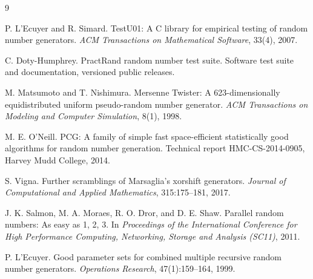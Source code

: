 \documentclass[11pt,a4paper]{article}
\begin{document}
\begin{thebibliography}{9}

P. L'Ecuyer and R. Simard.
\newblock TestU01: A C library for empirical testing of random number generators.
\newblock \emph{ACM Transactions on Mathematical Software}, 33(4), 2007.

C. Doty-Humphrey.
\newblock PractRand random number test suite.
\newblock Software test suite and documentation, versioned public releases.

M. Matsumoto and T. Nishimura.
\newblock Mersenne Twister: A 623-dimensionally equidistributed uniform pseudo-random number generator.
\newblock \emph{ACM Transactions on Modeling and Computer Simulation}, 8(1), 1998.

M. E. O'Neill.
\newblock PCG: A family of simple fast space-efficient statistically good algorithms for random number generation.
\newblock Technical report HMC-CS-2014-0905, Harvey Mudd College, 2014.

S. Vigna.
\newblock Further scramblings of Marsaglia's xorshift generators.
\newblock \emph{Journal of Computational and Applied Mathematics}, 315:175--181, 2017.

J. K. Salmon, M. A. Moraes, R. O. Dror, and D. E. Shaw.
\newblock Parallel random numbers: As easy as 1, 2, 3.
\newblock In \emph{Proceedings of the International Conference for High Performance Computing, Networking, Storage and Analysis (SC11)}, 2011.

P. L'Ecuyer.
\newblock Good parameter sets for combined multiple recursive random number generators.
\newblock \emph{Operations Research}, 47(1):159--164, 1999.

\end{thebibliography}
\end{document}
